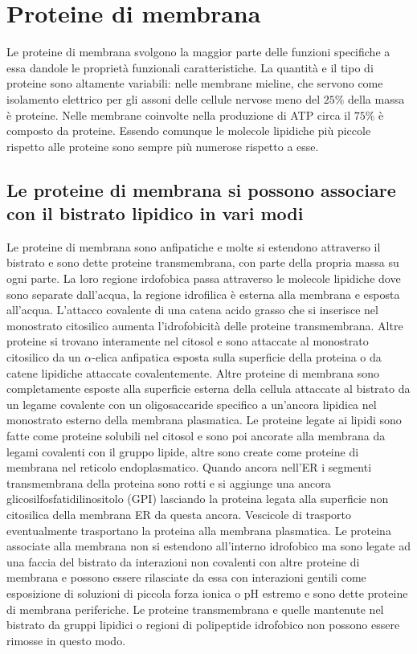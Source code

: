 \section{Proteine di membrana}
Le proteine di membrana svolgono la maggior parte delle funzioni specifiche a essa dandole le propriet\`a funzionali caratteristiche. La quantit\`a e il tipo di proteine sono altamente
variabili: nelle membrane mieline, che servono come isolamento elettrico per gli assoni delle cellule nervose meno del $25\%$ della massa \`e proteine. Nelle membrane coinvolte nella
produzione di ATP circa il $75\%$ \`e composto da proteine. Essendo comunque le molecole lipidiche pi\`u piccole rispetto alle proteine sono sempre pi\`u numerose rispetto a esse. 
\subsection{Le proteine di membrana si possono associare con il bistrato lipidico in vari modi}
Le proteine di membrana sono anfipatiche e molte si estendono attraverso il bistrato e sono dette proteine transmembrana, con parte della propria massa su ogni parte. La loro regione
irdofobica passa attraverso le molecole lipidiche dove sono separate dall'acqua, la regione idrofilica \`e esterna alla membrana e esposta all'acqua. L'attacco covalente di una catena
acido grasso che si inserisce nel monostrato citosilico aumenta l'idrofobicit\`a delle proteine transmembrana. Altre proteine si trovano interamente nel citosol e sono attaccate al
monostrato citosilico da un $\alpha$-elica anfipatica esposta sulla superficie della proteina o da catene lipidiche attaccate covalentemente. Altre proteine di membrana sono 
completamente esposte alla superficie esterna della cellula attaccate al bistrato da un legame covalente con un oligosaccaride specifico a un'ancora lipidica nel monostrato esterno
della membrana plasmatica. Le proteine legate ai lipidi sono fatte come proteine solubili nel citosol e sono poi ancorate alla membrana da legami covalenti con il gruppo lipide, altre
sono create come proteine di membrana nel reticolo endoplasmatico. Quando ancora nell'ER i segmenti transmembrana della proteina sono rotti e si aggiunge una ancora 
glicosilfosfatidilinositolo (GPI) lasciando la proteina legata alla superficie non citosilica della membrana ER da questa ancora. Vescicole di trasporto eventualmente trasportano
la proteina alla membrana plasmatica. Le proteina associate alla membrana non si estendono all'interno idrofobico ma sono legate ad una faccia del bistrato da interazioni non covalenti
con altre proteine di membrana e possono essere rilasciate da essa con interazioni gentili come esposizione di soluzioni di piccola forza ionica o pH estremo e sono dette proteine di 
membrana periferiche. Le proteine transmembrana e quelle mantenute nel bistrato da gruppi lipidici o regioni di polipeptide idrofobico non possono essere rimosse in questo modo.
